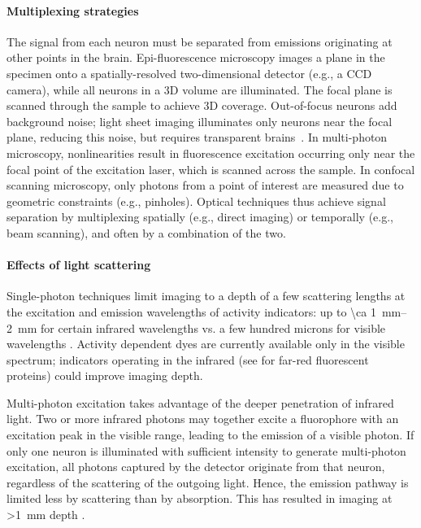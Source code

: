 \paragraph{Multiplexing strategies}
The signal from each neuron must be separated from emissions originating at other points in the brain.
Epi-fluorescence microscopy images a plane in the specimen onto a spatially-resolved two-dimensional detector (e.g., a CCD camera), while all neurons in a 3D volume are illuminated. The focal plane is scanned through the sample to achieve 3D coverage. Out-of-focus neurons add background noise; light sheet imaging illuminates only neurons near the focal plane, reducing this noise, but requires transparent brains~\cite{ahrens13}.
In multi-photon microscopy, nonlinearities result in fluorescence excitation occurring only near the focal point of the excitation laser, which is scanned across the sample.
In confocal scanning microscopy, only photons from a point of interest are measured due to geometric constraints (e.g., pinholes).
Optical techniques thus achieve signal separation by multiplexing spatially (e.g., direct imaging) or temporally (e.g., beam scanning), and often by a combination of the two.

\paragraph{Effects of light scattering}
Single-photon techniques limit imaging to a depth of a few scattering lengths at the excitation and emission wavelengths of activity indicators: up to \SIrange{\ca 1}{2}{\milli\meter} for certain infrared wavelengths \cite{horton13,kobat09,Kobat2011} vs. a few hundred microns for visible wavelengths \cite{Wilt2009}.
Activity dependent dyes are currently available only in the visible spectrum; indicators operating in the infrared (see \cite{filonov11,shcherbakova13, Shcherbo2009} for far-red fluorescent proteins) could improve imaging depth.

Multi-photon excitation takes advantage of the deeper penetration of infrared light.
Two or more infrared photons may together excite a fluorophore with an excitation peak in the visible range, leading to the emission of a visible photon.
If only one neuron is illuminated with sufficient intensity to generate multi-photon excitation, all photons captured by the detector originate from that neuron, regardless of the scattering of the outgoing light. Hence, the emission pathway is limited less by scattering than by absorption.
This has resulted in imaging at \SI{>1}{\milli\meter} depth \cite{horton13,kobat09, Kobat2011}.

